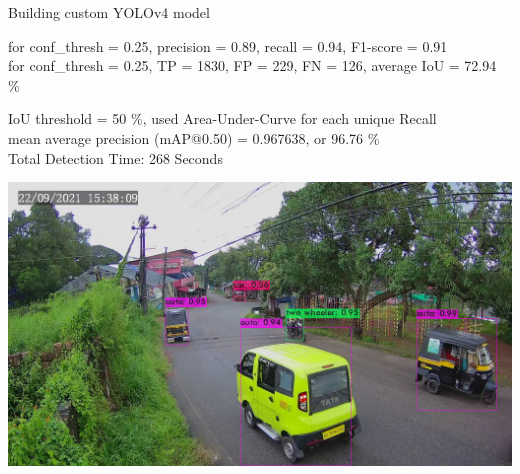 \documentclass{beamer}
\begin{document}
\begin{frame}[allowframebreaks]{Building custom YOLOv4 model}
\begin{scriptsize}
			for conf\_thresh = 0.25, precision = 0.89, recall = 0.94, F1-score = 0.91  \\
			for conf\_thresh = 0.25, TP = 1830, FP = 229, FN = 126, average IoU = 72.94 \%  \
			
			IoU threshold = 50 \%, used Area-Under-Curve for each unique Recall  \\
			mean average precision (mAP@0.50) = 0.967638, or 96.76 \% \\
			Total Detection Time: 268 Seconds
		\end{scriptsize}		
		\newpage
		
		\begin{center}
			\includegraphics[width=\linewidth]{res/data_set1/predictions}
		\end{center}
	\end{frame}
\end{document}
